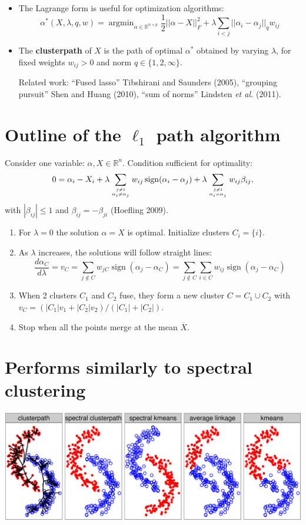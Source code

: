 \documentclass[]{posterDIGITEO}
\newcommand{\RR}{\mathbb R}
\begin{document}
\begin{multicols}{2}
\begin{itemize}
 

 
\item The Lagrange form is useful for optimization algorithms:
$$
\alpha^*(X,\lambda,q,w)=\operatorname{argmin}_{\alpha\in\RR^{n\times p}}
\frac 1 2||\alpha-X||_F^2+\lambda\sum_{i<j}||\alpha_i-\alpha_j||_q w_{ij}
$$ 
\item The \textbf{clusterpath} of $X$ is the path of optimal
  $\alpha^*$ obtained by varying $\lambda$, for fixed weights
  $w_{ij}>0$ and norm $q\in\{1,2,\infty\}$.



 {\small 
Related work: ``Fused lasso'' Tibshirani and Saunders (2005),
``grouping pursuit'' Shen and Huang (2010), ``sum of norms'' Lindsten
\emph{et al.}  (2011).
}
\end{itemize} 

\section{Outline of the $\ell_1$ path algorithm}
Consider one variable: $\alpha,X\in\RR^n$. Condition sufficient for optimality:
$$0 = \alpha_{i} - X_{i} + 
\lambda \sum_{j\neq i\atop \alpha_i \neq \alpha_j}w_{ij}
\operatorname{sign}({\alpha_i-\alpha_j}) + 
\lambda \sum_{j\neq i \atop \alpha_i = \alpha_j}w_{ij} \beta_{ij},$$
with $|\beta_{ij}|\leq 1$ and $\beta_{ij}=-\beta_{ji}$ (Hoefling 2009).
\begin{enumerate}
\item For $\lambda=0$ the solution $\alpha=X$ is optimal. Initialize
  clusters $C_i = \{i\}$. 
\item As $\lambda$ increases, the solutions will follow straight
  lines:
$$\frac {d\alpha_C}{d\lambda}=v_C = 
\sum_{j\not\in C}w_{jC}\operatorname{sign}(\alpha_j-\alpha_C)=
\sum_{j\not\in C}\sum_{i\in C} w_{ij}\operatorname{sign}(\alpha_j-\alpha_C)$$
\item When 2 clusters $C_1$ and $C_2$ fuse, they form a
  new cluster $C = C_1\cup C_2$ with $v_C = (
|C_1|v_1 + |C_2|v_2
)/(
|C_1|+|C_2|
)$.
\item Stop when all the points merge at the mean $\overline X$.
\end{enumerate}

\section{Performs similarly to spectral clustering}
\includegraphics[width=\columnwidth]{moons}



\end{multicols}
\end{document}
